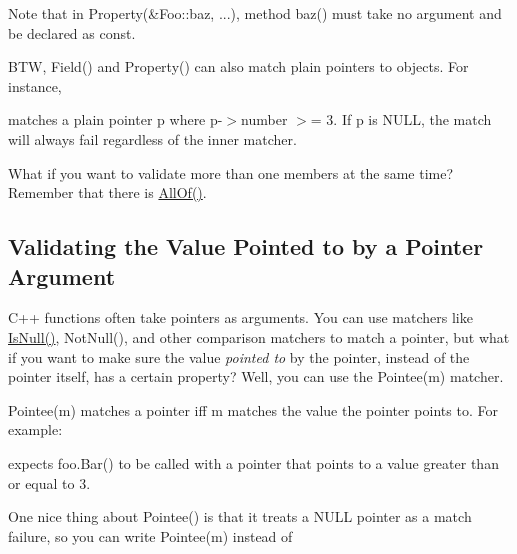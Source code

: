 Note that in {\ttfamily Property(\&\+Foo\+::baz, ...)}, method {\ttfamily baz()} must take no argument and be declared as {\ttfamily const}.

B\+TW, {\ttfamily Field()} and {\ttfamily Property()} can also match plain pointers to objects. For instance,


\begin{DoxyCode}{0}
\end{DoxyCode}


matches a plain pointer {\ttfamily p} where {\ttfamily p-\/$>$number $>$= 3}. If {\ttfamily p} is {\ttfamily N\+U\+LL}, the match will always fail regardless of the inner matcher.

What if you want to validate more than one members at the same time? Remember that there is {\ttfamily \mbox{\hyperlink{namespacetesting_af7618e8606c1cb45738163688944e2b7}{All\+Of()}}}.

\subsection*{Validating the Value Pointed to by a Pointer Argument}

C++ functions often take pointers as arguments. You can use matchers like {\ttfamily \mbox{\hyperlink{namespacetesting_1_1internal_adcfd37a66bc4cb0e8291cf46e1a6c72b}{Is\+Null()}}}, {\ttfamily Not\+Null()}, and other comparison matchers to match a pointer, but what if you want to make sure the value {\itshape pointed to} by the pointer, instead of the pointer itself, has a certain property? Well, you can use the {\ttfamily Pointee(m)} matcher.

{\ttfamily Pointee(m)} matches a pointer iff {\ttfamily m} matches the value the pointer points to. For example\+:


\begin{DoxyCode}{0}
\end{DoxyCode}


expects {\ttfamily foo.\+Bar()} to be called with a pointer that points to a value greater than or equal to 3.

One nice thing about {\ttfamily Pointee()} is that it treats a {\ttfamily N\+U\+LL} pointer as a match failure, so you can write {\ttfamily Pointee(m)} instead of


\begin{DoxyCode}{0}
\end{DoxyCode}



